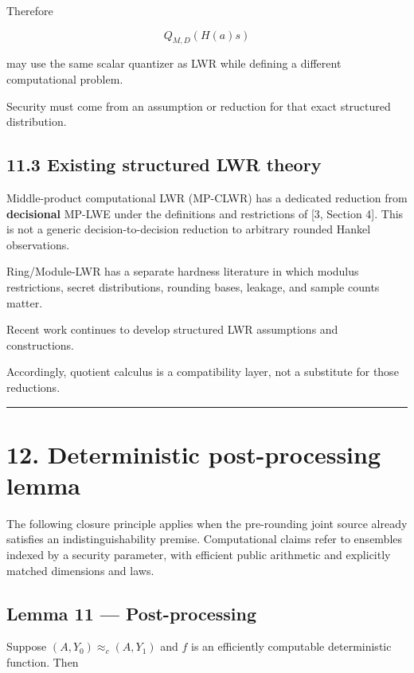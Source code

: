\documentclass[11pt,a4paper]{article}
\begin{document}
Therefore

\[
Q_{M,D}(H(a)s)
\]

may use the same scalar quantizer as LWR while defining a different computational problem.

Security must come from an assumption or reduction for that exact structured distribution.

\subsection{11.3 Existing structured LWR theory}\label{existing-structured-lwr-theory}

Middle-product computational LWR (MP-CLWR) has a dedicated reduction from \textbf{decisional} MP-LWE under the definitions and restrictions of {[}3, Section 4{]}. This is not a generic decision-to-decision reduction to arbitrary rounded Hankel observations.

Ring/Module-LWR has a separate hardness literature in which modulus restrictions, secret distributions, rounding bases, leakage, and sample counts matter.

Recent work continues to develop structured LWR assumptions and constructions.

Accordingly, quotient calculus is a compatibility layer, not a substitute for those reductions.

\begin{center}\rule{0.5\linewidth}{0.5pt}\end{center}

\section{12. Deterministic post-processing lemma}\label{deterministic-post-processing-lemma}

The following closure principle applies when the pre-rounding joint source already satisfies an indistinguishability premise. Computational claims refer to ensembles indexed by a security parameter, with efficient public arithmetic and explicitly matched dimensions and laws.

\subsection{Lemma 11 --- Post-processing}\label{lemma-11-post-processing}

Suppose \((A,Y_0)\approx_c(A,Y_1)\) and \(f\) is an efficiently computable deterministic function. Then
\end{document}
